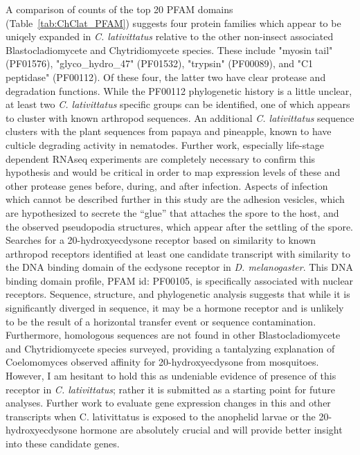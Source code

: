 \indent A comparison of counts of the top 20 PFAM domains (Table~\ref{tab:ChClat_PFAM}) suggests four protein families which appear to be uniqely expanded in \textit{C. lativittatus} relative to the other non-insect associated Blastocladiomycete and Chytridiomycete species. These include "myosin tail" (PF01576), "glyco\_hydro\_47" (PF01532), "trypsin" (PF00089), and "C1 peptidase" (PF00112). Of these four, the latter two have clear protease and degradation functions. While the PF00112 phylogenetic history is a little unclear, at least two \textit{C. lativittatus} specific groups can be identified, one of which appears to cluster with known arthropod sequences. An additional \textit{C. lativittatus} sequence clusters with the plant sequences from papaya and pineapple, known to have culticle degrading activity in nematodes. Further work, especially life-stage dependent RNAseq experiments are completely necessary to confirm this hypothesis and would be critical in order to map expression levels of these and other protease genes before, during, and after infection. Aspects of infection which cannot be described further in this study are the adhesion vesicles, which are hypothesized to secrete the “glue” that attaches the spore to the host, and the observed pseudopodia structures, which appear after the settling of the spore. \\
\indent Searches for a 20-hydroxyecdysone receptor based on similarity to known arthropod receptors identified at least one candidate transcript with similarity to the DNA binding domain of the ecdysone receptor in \textit{D. melanogaster}. This DNA binding domain profile, PFAM id: PF00105, is specifically associated with nuclear receptors. Sequence, structure, and phylogenetic analysis suggests that while it is significantly diverged in sequence, it may be a hormone receptor and is unlikely to be the result of a horizontal transfer event or sequence contamination. Furthermore, homologous sequences are not found in other Blastocladiomycete and Chytridiomycete species surveyed, providing a tantalyzing explanation of Coelomomyces observed affinity for 20-hydroxyecdysone from mosquitoes. However, I am hesitant to hold this as undeniable evidence of presence of this receptor in \textit{C. lativittatus}; rather it is submitted as a starting point for future analyses. Further work to evaluate gene expression changes in this and other transcripts when C. lativittatus is exposed to the anophelid larvae or the 20-hydroxyecdysone hormone are absolutely crucial and will provide better insight into these candidate genes. \\
